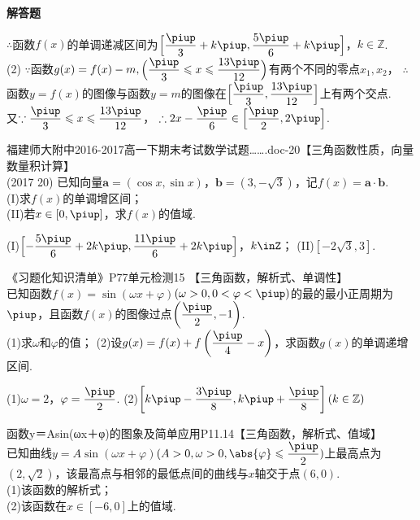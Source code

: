 \begin{exercise}{\bf 解答题}
\begin{answer}
        $\therefore$函数$f(x)$的单调递减区间为$\Bigl[\dfrac{\piup}3+k\piup,\dfrac{5\piup}6+k\piup\Bigr]$，${k\in\mathbb{Z}}$.\\
        (2) $\because$函数$g(x)=f(x)-m,\Bigl(\dfrac{\piup}3\leqslant x\leqslant\dfrac{13\piup}{12}\Bigr)$有两个不同的零点$x_1,x_2$，
        $\therefore$函数$y=f(x)$的图像与函数$y=m$的图像在$\Bigl[\dfrac{\piup}3,\dfrac{13\piup}{12}\Bigr]$上有两个交点.\\
        又$\because \dfrac{\piup}3\leqslant x\leqslant\dfrac{13\piup}{12}$，
        $\therefore 2x-\dfrac{\piup}6\in\Bigl[\dfrac{\piup}2,2\piup\Bigr]$.
      \end{answer}
    \item 福建师大附中2016-2017高一下期末考试数学试题…….doc-20【三角函数性质，向量数量积计算】\\
      (2017  20)
      已知向量$\bm a=(\cos x,\sin x)$，$\bm b=(3,-\sqrt3)$，记$f(x)=\bm a\cdot\bm b$.\\
      (I)求$f(x)$的单调增区间；\\
      (II)若$x\in[0,\piup]$，求$f(x)$的值域.
      \begin{answer}
        (I)$\Bigl[-\dfrac{5\piup}6+2k\piup,\dfrac{11\piup}6+2k\piup\Bigr]$，$k\inZ$；
        (II)$[-2\sqrt3,3]$.
      \end{answer}
    \item 《习题化知识清单》P77单元检测15 【三角函数，解析式、单调性】\\
      已知函数$f(x)=\sin(\omega x+\varphi)$$(\omega>0,0<\varphi<\piup)$的最的最小正周期为$\piup$，且函数$f(x)$的图像过点$\left(\dfrac{\piup}2,-1\right)$.\\
      (1)求$\omega$和$\varphi$的值；
      (2)设$g(x)=f(x)+f\left(\dfrac{\piup}4-x \right)$，求函数$g(x)$的单调递增区间.
      \begin{answer}
        (1)$\omega=2$，$\varphi=\dfrac{\piup}2$.
        (2)$\left[k\piup-\dfrac{3\piup}8,k\piup+\dfrac{\piup}8\right](k\in\mathbb{Z})$
      \end{answer}
    \item 函数y＝Asin(ωx＋φ)的图象及简单应用P11.14【三角函数，解析式、值域】\\
      已知曲线$y=A\sin(\omega x+\varphi)$$(A>0,\omega>0,\abs{\varphi}\leqslant\dfrac{\piup}2)$上最高点为$(2,\sqrt{2})$，该最高点与相邻的最低点间的曲线与$x$轴交于点$(6,0)$.\\
      (1)该函数的解析式；\\
      (2)该函数在$x\in[-6,0]$上的值域.
      \begin{answer}

\end{answer}
\end{exercise}
